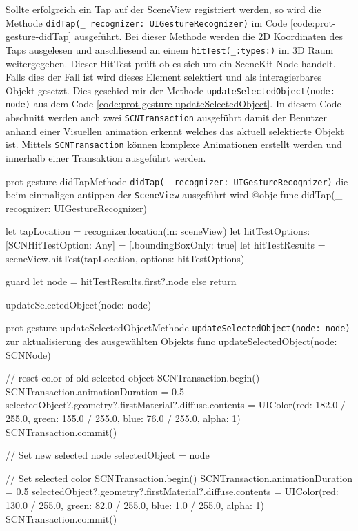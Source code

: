 \begin{description}
    Sollte erfolgreich ein Tap auf der SceneView registriert werden, so wird die Methode \texttt{didTap(\_ recognizer: UIGestureRecognizer)} im Code \ref{code:prot-gesture-didTap} ausgeführt. Bei dieser Methode werden die 2D Koordinaten des Taps ausgelesen und anschliesend an einem \texttt{hitTest(\_:types:)} im 3D Raum weitergegeben. Dieser HitTest prüft ob es sich um ein SceneKit Node handelt. Falls dies der Fall ist wird dieses Element selektiert und als interagierbares Objekt gesetzt. Dies geschied mir der Methode \texttt{updateSelectedObject(node: node)} aus dem Code \ref{code:prot-gesture-updateSelectedObject}. In diesem Code abschnitt werden auch zwei \texttt{SCNTransaction} ausgeführt damit der Benutzer anhand einer Visuellen animation erkennt welches das aktuell selektierte Objekt ist. Mittels \texttt{SCNTransaction} können komplexe Animationen erstellt werden und innerhalb einer Transaktion ausgeführt werden.

    \begin{code}{prot-gesture-didTap}{Methode \texttt{didTap(\_ recognizer: UIGestureRecognizer)} die beim einmaligen antippen der \texttt{SceneView} ausgeführt wird}
    @objc
    func didTap(_ recognizer: UIGestureRecognizer) {
        let tapLocation = recognizer.location(in: sceneView)
        let hitTestOptions: [SCNHitTestOption: Any] = [.boundingBoxOnly: true]
        let hitTestResults = sceneView.hitTest(tapLocation, options: hitTestOptions)

        guard let node = hitTestResults.first?.node else {return}
        
        updateSelectedObject(node: node)
    }
    \end{code}

    \begin{code}{prot-gesture-updateSelectedObject}{Methode \texttt{updateSelectedObject(node: node)} zur aktualisierung des ausgewählten Objekts}
    func updateSelectedObject(node: SCNNode) {
        // reset color of old selected object
        SCNTransaction.begin()
        SCNTransaction.animationDuration = 0.5
        selectedObject?.geometry?.firstMaterial?.diffuse.contents = UIColor(red: 182.0 / 255.0, green: 155.0 / 255.0, blue: 76.0 / 255.0, alpha: 1)
        SCNTransaction.commit()
        
        // Set new selected node
        selectedObject = node
        
        // Set selected color
        SCNTransaction.begin()
        SCNTransaction.animationDuration = 0.5
        selectedObject?.geometry?.firstMaterial?.diffuse.contents = UIColor(red: 130.0 / 255.0, green: 82.0 / 255.0, blue: 1.0 / 255.0, alpha: 1)
        SCNTransaction.commit()
    }
    \end{code}


\end{description}
